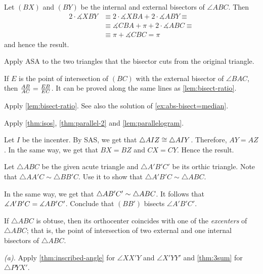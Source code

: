 \begin{multicols}{2}
Let $(BX)$ and $(BY)$ be the internal and external bisectors of $\angle ABC$.
Then 
\begin{align*}
2\cdot \measuredangle XBY&\equiv2\cdot \measuredangle XBA+2\cdot \measuredangle ABY\equiv
\\
&\equiv
\measuredangle CBA+\pi+2\cdot \measuredangle ABC\equiv
\\
&\equiv\pi+\measuredangle CBC=\pi
\end{align*}
and hence the result.

Apply ASA to the two triangles that the bisector cuts from the original triangle. 

If $E$ is the point of intersection of $(BC)$ 
with the external bisector of $\angle BAC$, then 
$\frac{AB}{AC}\z=\frac{EB}{EC}$.
It can be proved along the same lines as \ref{lem:bisect-ratio}.

Apply \ref{lem:bisect-ratio}.
See also the solution of \ref{ex:abs-bisect=median}.

Apply \ref{thm:isos}, \ref{thm:parallel-2} and \ref{lem:parallelogram}.

Let $I$ be the incenter.
By SAS, we get that $\triangle AIZ\z\cong\triangle AIY$.
Therefore, $AY=AZ$.
In the same way, we get that $BX=BZ$ and $CX=CY$.
Hence the result.

Let $\triangle ABC$ be the given acute triangle and $\triangle A'B'C'$ 
be its orthic triangle.
Note that $\triangle AA'C\sim\triangle BB'C$.
Use it to show that $\triangle A'B'C\sim \triangle ABC$.

In the same way, we get that $\triangle AB'C'\z\sim \triangle ABC$.
It follows that $\measuredangle A'B'C\z=\measuredangle AB'C'$.
Conclude that $(BB')$ bisects $\angle A'B'C'$.

If $\triangle ABC$ is obtuse, then its orthocenter coincides with one of the \emph{excenters} of $\triangle ABC$;
that is, 
the point of intersection of two external and one internal bisectors of $\triangle ABC$.

\setcounter{eqtn}{0}

 \textit{(a).}
Apply \ref{thm:inscribed-angle} for $\angle XX'Y$ and $\angle X'YY'$
and \ref{thm:3sum} for $\triangle PYX'$.


\end{multicols}
